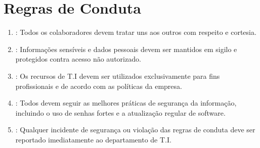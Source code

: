 \documentclass[letterpaper,10pt,brazil]{sphinxmanual}
\begin{document}
\section{Regras de Conduta}
\label{\detokenize{regras:regras-de-conduta}}\begin{enumerate}
%
\item {} 
\sphinxAtStartPar
{}: Todos os colaboradores devem tratar uns aos outros com respeito e cortesia.

\item {} 
\sphinxAtStartPar
{}: Informações sensíveis e dados pessoais devem ser mantidos em sigilo e protegidos contra acesso não autorizado.

\item {} 
\sphinxAtStartPar
{}: Os recursos de T.I devem ser utilizados exclusivamente para fins profissionais e de acordo com as políticas da empresa.

\item {} 
\sphinxAtStartPar
{}: Todos devem seguir as melhores práticas de segurança da informação, incluindo o uso de senhas fortes e a atualização regular de software.

\item {} 
\sphinxAtStartPar
{}: Qualquer incidente de segurança ou violação das regras de conduta deve ser reportado imediatamente ao departamento de T.I.

\end{enumerate}
\end{document}
